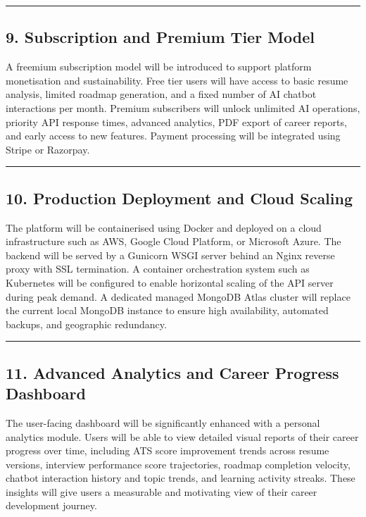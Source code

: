 \documentclass[12pt]{article}
\begin{document}
\noindent\rule{\textwidth}{0.4pt}

\subsection{9. Subscription and Premium Tier Model}

A freemium subscription model will be introduced to support platform monetisation and sustainability. Free tier users will have access to basic resume analysis, limited roadmap generation, and a fixed number of AI chatbot interactions per month. Premium subscribers will unlock unlimited AI operations, priority API response times, advanced analytics, PDF export of career reports, and early access to new features. Payment processing will be integrated using Stripe or Razorpay.

\noindent\rule{\textwidth}{0.4pt}

\subsection{10. Production Deployment and Cloud Scaling}

The platform will be containerised using Docker and deployed on a cloud infrastructure such as AWS, Google Cloud Platform, or Microsoft Azure. The backend will be served by a Gunicorn WSGI server behind an Nginx reverse proxy with SSL termination. A container orchestration system such as Kubernetes will be configured to enable horizontal scaling of the API server during peak demand. A dedicated managed MongoDB Atlas cluster will replace the current local MongoDB instance to ensure high availability, automated backups, and geographic redundancy.

\noindent\rule{\textwidth}{0.4pt}

\subsection{11. Advanced Analytics and Career Progress Dashboard}

The user-facing dashboard will be significantly enhanced with a personal analytics module. Users will be able to view detailed visual reports of their career progress over time, including ATS score improvement trends across resume versions, interview performance score trajectories, roadmap completion velocity, chatbot interaction history and topic trends, and learning activity streaks. These insights will give users a measurable and motivating view of their career development journey.
\end{document}

